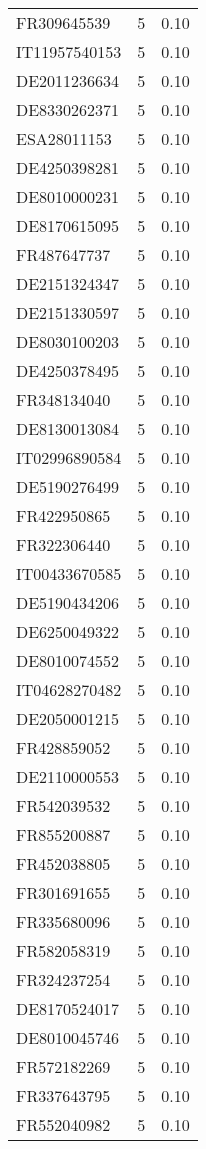 \begin{table*}[htbp]
\begin{tabular}{lrr}
FR309645539 & 5 & 0.10 \\
IT11957540153 & 5 & 0.10 \\
DE2011236634 & 5 & 0.10 \\
DE8330262371 & 5 & 0.10 \\
ESA28011153 & 5 & 0.10 \\
DE4250398281 & 5 & 0.10 \\
DE8010000231 & 5 & 0.10 \\
DE8170615095 & 5 & 0.10 \\
FR487647737 & 5 & 0.10 \\
DE2151324347 & 5 & 0.10 \\
DE2151330597 & 5 & 0.10 \\
DE8030100203 & 5 & 0.10 \\
DE4250378495 & 5 & 0.10 \\
FR348134040 & 5 & 0.10 \\
DE8130013084 & 5 & 0.10 \\
IT02996890584 & 5 & 0.10 \\
DE5190276499 & 5 & 0.10 \\
FR422950865 & 5 & 0.10 \\
FR322306440 & 5 & 0.10 \\
IT00433670585 & 5 & 0.10 \\
DE5190434206 & 5 & 0.10 \\
DE6250049322 & 5 & 0.10 \\
DE8010074552 & 5 & 0.10 \\
IT04628270482 & 5 & 0.10 \\
DE2050001215 & 5 & 0.10 \\
FR428859052 & 5 & 0.10 \\
DE2110000553 & 5 & 0.10 \\
FR542039532 & 5 & 0.10 \\
FR855200887 & 5 & 0.10 \\
FR452038805 & 5 & 0.10 \\
FR301691655 & 5 & 0.10 \\
FR335680096 & 5 & 0.10 \\
FR582058319 & 5 & 0.10 \\
FR324237254 & 5 & 0.10 \\
DE8170524017 & 5 & 0.10 \\
DE8010045746 & 5 & 0.10 \\
FR572182269 & 5 & 0.10 \\
FR337643795 & 5 & 0.10 \\
FR552040982 & 5 & 0.10 \\

\end{tabular}
\end{table*}
